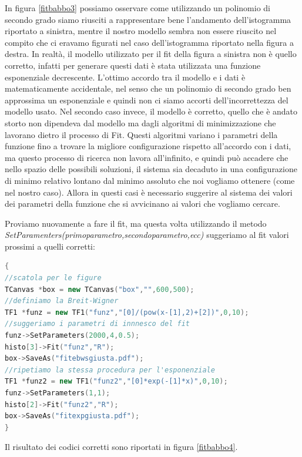 \documentclass[11pt,fleqn]{book} %
\begin{document}
In figura \ref{fitbabbo3} possiamo osservare come utilizzando un polinomio di secondo grado siamo riusciti a rappresentare bene l'andamento dell'istogramma riportato a sinistra, mentre il nostro modello sembra non essere riuscito nel compito che ci eravamo figurati nel caso dell'istogramma riportato nella figura a destra.
In realtà, il modello utilizzato per il fit della figura a sinistra non è quello corretto, infatti per generare questi dati è stata utilizzata una funzione esponenziale decrescente. L'ottimo accordo tra il modello e i dati è matematicamente accidentale, nel senso che un polinomio di secondo grado ben approssima un esponenziale e quindi non ci siamo accorti dell'incorrettezza del modello usato.
Nel secondo caso invece, il modello è corretto, quello che è andato storto non dipendeva dal modello ma dagli algoritmi di minimizzazione che lavorano dietro il processo di Fit. Questi algoritmi variano i parametri della funzione fino a trovare la migliore configurazione rispetto all'accordo con i dati, ma questo processo di ricerca non lavora all'infinito, e quindi può accadere che nello spazio delle possibili soluzioni, il sistema sia decaduto in una configurazione di minimo relativo lontano dal minimo assoluto che noi vogliamo ottenere (come nel nostro caso).
Allora in questi casi è necessario suggerire al sistema dei valori dei parametri della funzione che si avvicinano ai valori che vogliamo cercare.

Proviamo nuovamente a fare il fit, ma questa volta utilizzando il metodo \textit{SetParamenters(primoparametro,secondoparametro,ecc)} suggeriamo al fit valori prossimi a quelli corretti:

\begin{lstlisting}[language=c++]
{
//scatola per le figure
TCanvas *box = new TCanvas("box","",600,500);
//definiamo la Breit-Wigner
TF1 *funz = new TF1("funz","[0]/(pow(x-[1],2)+[2])",0,10);
//suggeriamo i parametri di innnesco del fit
funz->SetParameters(2000,4,0.5);
histo[3]->Fit("funz","R");
box->SaveAs("fitebwsgiusta.pdf");
//ripetiamo la stessa procedura per l'esponenziale
TF1 *funz2 = new TF1("funz2","[0]*exp(-[1]*x)",0,10);
funz->SetParameters(1,1);
histo[2]->Fit("funz2","R");
box->SaveAs("fitexpgiusta.pdf");
}
\end{lstlisting}
Il risultato dei codici corretti sono riportati in figura \ref{fitbabbo4}.
\end{document}

